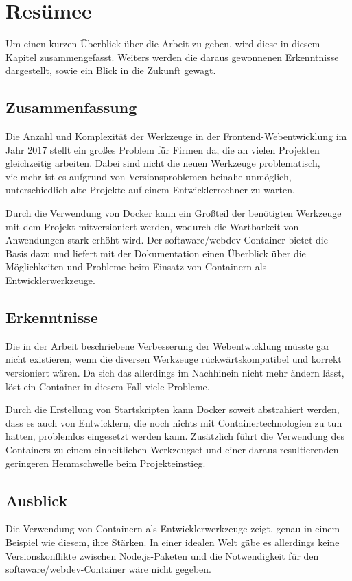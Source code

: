 \chapter{Resümee}
\label{cha:resume}
Um einen kurzen Überblick über die Arbeit zu geben, wird diese in diesem Kapitel zusammengefasst.
Weiters werden die daraus gewonnenen Erkenntnisse dargestellt, sowie ein Blick in die Zukunft gewagt.

\section{Zusammenfassung}
\label{sec:summary}
Die Anzahl und Komplexität der Werkzeuge in der Frontend-Webentwicklung im Jahr 2017 stellt ein großes Problem für Firmen da, die an vielen Projekten gleichzeitig arbeiten.
Dabei sind nicht die neuen Werkzeuge problematisch, vielmehr ist es aufgrund von Versionsproblemen beinahe unmöglich, unterschiedlich alte Projekte auf einem Entwicklerrechner zu warten.

Durch die Verwendung von Docker kann ein Großteil der benötigten Werkzeuge mit dem Projekt mitversioniert werden, wodurch die Wartbarkeit von Anwendungen stark erhöht wird.
Der softaware/webdev-Container bietet die Basis dazu und liefert mit der Dokumentation einen Überblick über die Möglichkeiten und Probleme beim Einsatz von Containern als Entwicklerwerkzeuge.

\section{Erkenntnisse}
\label{sec:findings}
Die in der Arbeit beschriebene Verbesserung der Webentwicklung müsste gar nicht existieren, wenn die diversen Werkzeuge rückwärtskompatibel und korrekt versioniert wären.
Da sich das allerdings im Nachhinein nicht mehr ändern lässt, löst ein Container in diesem Fall viele Probleme.

Durch die Erstellung von Startskripten kann Docker soweit abstrahiert werden, dass es auch von Entwicklern, die noch nichts mit Containertechnologien zu tun hatten, problemlos eingesetzt werden kann.
Zusätzlich führt die Verwendung des Containers zu einem einheitlichen Werkzeugset und einer daraus resultierenden geringeren Hemmschwelle beim Projekteinstieg.

\section{Ausblick}
\label{sec:outlook}
Die Verwendung von Containern als Entwicklerwerkzeuge zeigt, genau in einem Beispiel wie diesem, ihre Stärken.
In einer idealen Welt gäbe es allerdings keine Versionskonflikte zwischen Node.js-Paketen und die Notwendigkeit für den softaware/webdev-Container wäre nicht gegeben.
